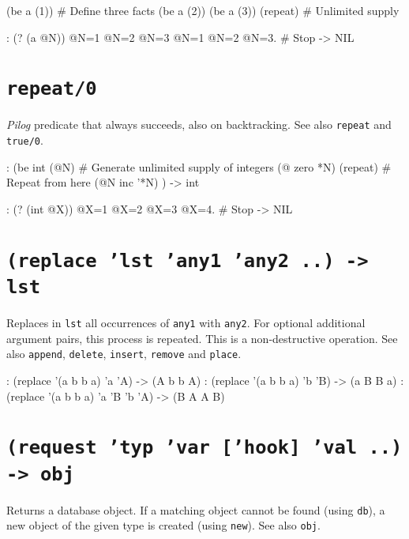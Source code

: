 \begin{wideverbatim}
(be a (1))     # Define three facts
(be a (2))
(be a (3))
(repeat)       # Unlimited supply

: (? (a @N))
 @N=1
 @N=2
 @N=3
 @N=1
 @N=2
 @N=3.         # Stop
-> NIL
\end{wideverbatim}

 
\section*{\texttt{repeat/0}}
\label{sec:func-ref-R-repeat/0}


\emph{Pilog} predicate that always succeeds, also on
backtracking. See also \texttt{repeat} and \texttt{true/0}.


\begin{wideverbatim}
: (be int (@N)       # Generate unlimited supply of integers
   (@ zero *N)
   (repeat)          # Repeat from here
   (@N inc '*N) )
-> int

:  (? (int @X))
 @X=1
 @X=2
 @X=3
 @X=4.               # Stop
-> NIL
\end{wideverbatim}

 
\section*{\texttt{(replace 'lst 'any1 'any2 ..) -> lst}}
\label{sec:func-ref-R-(replace 'lst 'any1 'any2 ..) -> lst}


Replaces in \texttt{lst} all occurrences of \texttt{any1} with \texttt{any2}. For optional
additional argument pairs, this process is repeated. This is a
non-destructive operation. See also \texttt{append}, \texttt{delete}, \texttt{insert},
\texttt{remove} and \texttt{place}.


\begin{wideverbatim}
: (replace '(a b b a) 'a 'A)
-> (A b b A)
: (replace '(a b b a) 'b 'B)
-> (a B B a)
: (replace '(a b b a) 'a 'B 'b 'A)
-> (B A A B)
\end{wideverbatim}

 
\section*{\texttt{(request 'typ 'var ['hook] 'val ..) -> obj}}
\label{sec:func-ref-R-(request 'typ 'var ['hook] 'val ..) -> obj}


Returns a database object. If a matching object cannot be found (using
\texttt{db}), a new object of the given type is created (using \texttt{new}). See also
\texttt{obj}.


